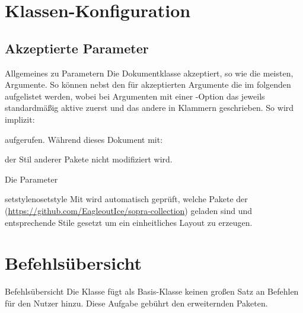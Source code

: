 \documentclass{sopra-seraphim}
\begin{document}
       

    \section{Klassen-Konfiguration}    
    \subsection{Akzeptierte Parameter}
    \begin{frame}[fragile]{Allgemeines zu Parametern}
    Die Dokumentklasse akzeptiert, so wie die meisten, Argumente. So können
    nebst den für  akzeptierten Argumente die im folgenden
    aufgelistet werden, wobei bei Argumenten mit einer -Option
    das jeweils standardmäßig aktive zuerst und das andere in Klammern
    geschrieben. So wird implizit:
    aufgerufen. Während dieses Dokument mit:
    der Stil anderer  Pakete nicht modifiziert wird.
    \end{frame}

    \begin{frame}[fragile]{Die Parameter}
        \begin{argument}{setstyle}{nosetstyle}
            Mit  wird automatisch geprüft, welche Pakete der  (\url{https://github.com/EagleoutIce/sopra-collection}) geladen sind und entsprechende Stile gesetzt um ein einheitliches Layout zu erzeugen.
        \end{argument}
    \end{frame}


    \section{Befehlsübersicht}
    \begin{frame}{Befehlsübersicht}
        Die Klasse fügt als Basis-Klasse keinen großen Satz an Befehlen für
        den Nutzer hinzu. Diese Aufgabe gebührt den erweiternden Paketen.        
    \end{frame}
    
    
\end{document}
